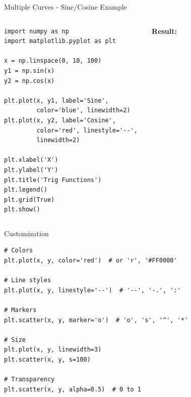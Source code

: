 \documentclass[aspectratio=169]{beamer}
\begin{document}
\begin{frame}[fragile]{Multiple Curves - Sine/Cosine Example}
\begin{columns}[T]
\begin{lstlisting}
import numpy as np
import matplotlib.pyplot as plt

x = np.linspace(0, 10, 100)
y1 = np.sin(x)
y2 = np.cos(x)

plt.plot(x, y1, label='Sine', 
         color='blue', linewidth=2)
plt.plot(x, y2, label='Cosine', 
         color='red', linestyle='--', 
         linewidth=2)

plt.xlabel('X')
plt.ylabel('Y')
plt.title('Trig Functions')
plt.legend()
plt.grid(True)
plt.show()
\end{lstlisting}

\textbf{Result:}
\begin{center}
\end{center}
\end{columns}
\end{frame}

\begin{frame}[fragile]{Customization}
\begin{lstlisting}
# Colors
plt.plot(x, y, color='red')  # or 'r', '#FF0000'

# Line styles
plt.plot(x, y, linestyle='--')  # '--', '-.', ':'

# Markers
plt.scatter(x, y, marker='o')  # 'o', 's', '^', '*'

# Size
plt.plot(x, y, linewidth=3)
plt.scatter(x, y, s=100)

# Transparency
plt.scatter(x, y, alpha=0.5)  # 0 to 1
\end{lstlisting}
\end{frame}
\end{document}
